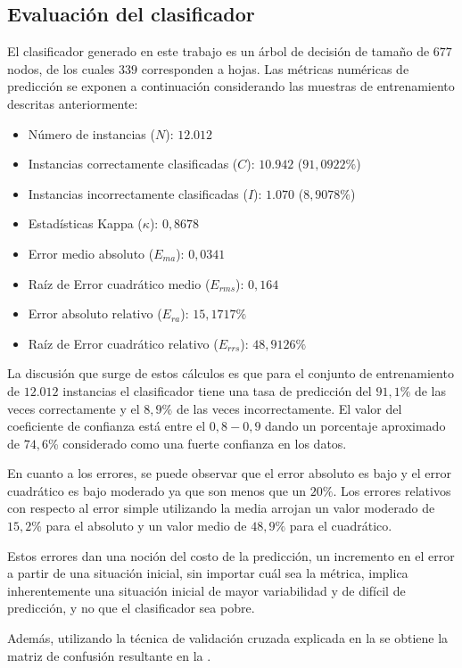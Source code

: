 \subsection{Evaluación del clasificador}

El clasificador generado en este trabajo es un árbol de decisión de
tamaño de $677$ nodos, de los cuales $339$ corresponden a hojas.
Las métricas numéricas de predicción se exponen a continuación considerando
las muestras de entrenamiento descritas anteriormente: 
\begin{itemize}
\item Número de instancias ($N$): $12.012$ 
\item Instancias correctamente clasificadas ($C$): $10.942$ ($91,0922\%$)
\item Instancias incorrectamente clasificadas ($I$): $1.070$ ($8,9078\%$)
\item Estadísticas Kappa ($\kappa$): $0,8678$ 
\item Error medio absoluto ($E_{ma}$): $0,0341$
\item Raíz de Error cuadrático medio ($E_{rms}$): $0,164$ 
\item Error absoluto relativo ($E_{ra}$): $15,1717\%$ 
\item Raíz de Error cuadrático relativo ($E_{rrs}$): $48,9126\%$ 
\end{itemize}
La discusión que surge de estos cálculos es que para el conjunto de
entrenamiento de $12.012$ instancias el clasificador tiene una tasa
de predicción del $91,1\%$ de las veces correctamente y el $8,9\%$
de las veces incorrectamente. El valor del coeficiente de confianza
está entre el $0,8-0,9$ dando un porcentaje aproximado de $74,6$\%
considerado como una fuerte confianza en los datos.

En cuanto a los errores, se puede observar que el error absoluto es
bajo y el error cuadrático es bajo moderado ya que son menos que un
$20\%$. Los errores relativos con respecto al error simple utilizando
la media arrojan un valor moderado de $15,2\%$ para el absoluto y
un valor medio de $48,9\%$ para el cuadrático. 

Estos errores dan una noción del costo de la predicción, un incremento
en el error a partir de una situación inicial, sin importar cuál sea
la métrica, implica inherentemente una situación inicial de mayor
variabilidad y de difícil de predicción, y no que el clasificador
sea pobre.

Además, utilizando la técnica de validación cruzada explicada en la
 se obtiene la matriz de confusión resultante
en la . 

